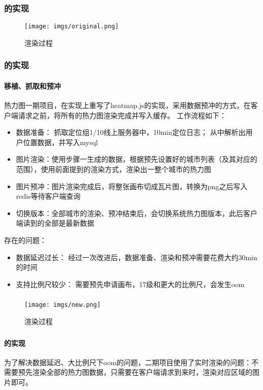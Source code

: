 \documentclass[c]{beamer}
\begin{document}
\begin{CJK}{UTF8}{song}
\begin{frame}\frametitle{\hmfst{}的实现}
    \begin{figure}[htbp]
      \centering
      \texttt{[image: imgs/original.png]}
      \caption{\hmfst{}渲染过程}
      \label{fig:hmrender}
    \end{figure}
\end{frame}

\begin{frame}\frametitle{\hmfst{}的实现}
    \framesubtitle{移植、抓取和预冲}

    热力图一期项目，在实现上重写了heatmap.js的实现，采用数据预冲的方式，在客户端请求之前，将所有的热力图渲染完成并写入缓存。
    \pause
    工作流程如下：
    \begin{itemize}
        \item 数据准备： 抓取定位组1/10线上服务器中，10min定位日志； 从中解析出用户位置数据，并写入mysql
        \item 图片渲染：使用步骤一生成的数据，根据预先设置好的城市列表（及其对应的范围），使用前面提到的渲染方式，渲染出一整个城市的热力图
        \item 图片预冲：图片渲染完成后，将整张画布切成瓦片图，转换为png之后写入redis等待客户端查询
        \item 切换版本：全部城市的渲染、预冲结束后，会切换系统热力图版本，此后客户端读到的全部是最新数据
    \end{itemize}
    \pause
    \hmfst{}存在的问题：
    \begin{itemize}
        \item 数据延迟过长： 经过一次改进后，数据准备、渲染和预冲需要花费大约30min的时间
        \item 支持比例尺较少： 需要预先申请画布，17级和更大的比例尺，会发生oom
    \end{itemize}
\end{frame}

\begin{frame}\frametitle{\hmsnd{}}
    \begin{figure}[htbp]
      \centering
      \texttt{[image: imgs/new.png]}
      \caption{\hmsnd{}渲染过程}
      \label{fig:hmrender}
    \end{figure}
\end{frame}

\begin{frame}\frametitle{\hmsnd{}}
    \framesubtitle{\rtrd{}的实现}
    为了解决数据延迟、大比例尺下oom的问题，二期项目使用了实时渲染的问题：不需要预先渲染全部的热力图数据，只需要在客户端请求到来时，渲染对应区域的图片即可。


\end{frame}
\end{CJK}
\end{document}
